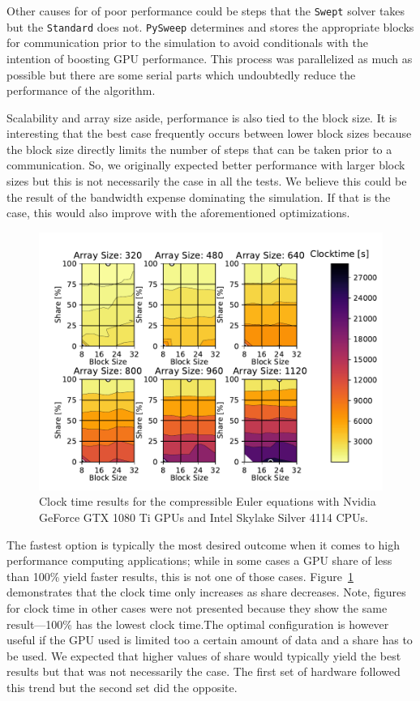 \documentclass[review]{elsarticle}
\def\oldCPU{s}
\def\oldGPU{s}
\def\pysweep{\texttt{PySweep}}
\def\Swept{\texttt{Swept}}
\def\Standard{\texttt{Standard}}
\def\oldCPU{Intel Skylake Silver 4114} %
\def\oldGPU{Nvidia GeForce GTX 1080 Ti}
\begin{document}
Other causes for of poor performance could be steps that the \Swept{} solver takes but the \Standard{} does not. \pysweep{} determines and stores the appropriate blocks for communication prior to the simulation to avoid conditionals with the intention of boosting GPU performance. This process was parallelized as much as possible but there are some serial parts which undoubtedly reduce the performance of the algorithm. 

Scalability and array size aside, performance is also tied to the block size. It is interesting that the best case frequently occurs between lower block sizes because the block size directly limits the number of steps that can be taken prior to a communication. So, we originally expected better performance with larger block sizes but this is not necessarily the case in all the tests. We believe this could be the result of the bandwidth expense dominating the simulation. If that is the case, this would also improve with the aforementioned optimizations.

\begin{figure}[htb!]
    \centering
    \includegraphics[scale=0.7]{figs/clockTimeSwepteulerOld.pdf}
    \caption{Clock time results  for the compressible Euler equations with \oldGPU{} GPUs and \oldCPU{} CPUs.}
    \label{fig:clocktimeOldEuler}
\end{figure}

The fastest option is typically the most desired outcome when it comes to high performance computing applications; while in some cases a GPU share of less than 100\% yield faster results, this is not one of those cases. Figure~\ref{fig:clocktimeOldEuler} demonstrates that the clock time only increases as share decreases. Note, figures for clock time in other cases were not presented because they show the same result---100\% has the lowest clock time.The optimal configuration is however useful if the GPU used is limited too a certain amount of data and a share has to be used. We expected that higher values of share would typically yield the best results but that was not necessarily the case. The first set of hardware followed this trend but the second set did the opposite. 
\end{document}
